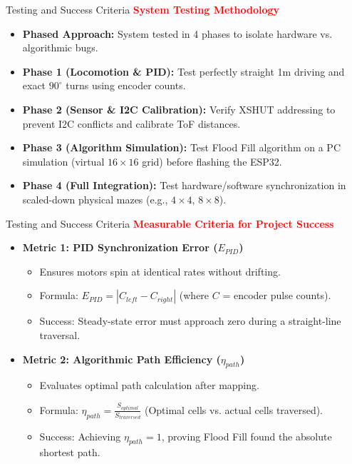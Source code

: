 \documentclass{beamer}
\begin{document}
\begin{frame}{Testing and Success Criteria}
  \transfade[duration=0.1]
  \textcolor{red}{\textbf{\large System Testing Methodology}}
  \vspace{0.5em}
  \begin{itemize}[<+->]
    \item \textbf{Phased Approach:} System tested in 4 phases to isolate hardware vs. algorithmic bugs.
    \item \textbf{Phase 1 (Locomotion \& PID):} Test perfectly straight 1m driving and exact $90^\circ$ turns using encoder counts.
    \item \textbf{Phase 2 (Sensor \& I2C Calibration):} Verify XSHUT addressing to prevent I2C conflicts and calibrate ToF distances.
    \item \textbf{Phase 3 (Algorithm Simulation):} Test Flood Fill algorithm on a PC simulation (virtual $16 \times 16$ grid) before flashing the ESP32.
    \item \textbf{Phase 4 (Full Integration):} Test hardware/software synchronization in scaled-down physical mazes (e.g., $4 \times 4$, $8 \times 8$).
  \end{itemize}
\end{frame}

\begin{frame}{Testing and Success Criteria}
  \transfade[duration=0.1]
  \textcolor{red}{\textbf{\large Measurable Criteria for Project Success}}
  \vspace{0.5em}
  \begin{itemize}[<+->]
    \item \textbf{Metric 1: PID Synchronization Error ($E_{PID}$)}
      \begin{itemize}[<+->]
        \item Ensures motors spin at identical rates without drifting.
        \item Formula: $E_{PID} = \left\vert{} C_{left} - C_{right} \right\vert{}$ (where $C$ = encoder pulse counts).
        \item Success: Steady-state error must approach zero during a straight-line traversal.
      \end{itemize}
    \item \textbf{Metric 2: Algorithmic Path Efficiency ($\eta_{path}$)}
      \begin{itemize}[<+->]
        \item Evaluates optimal path calculation after mapping.
        \item Formula: $\eta_{path} = \frac{S_{optimal}}{S_{traversed}}$ (Optimal cells vs. actual cells traversed).
        \item Success: Achieving $\eta_{path} = 1$, proving Flood Fill found the absolute shortest path.
      \end{itemize}
  \end{itemize}
\end{frame}
\end{document}
